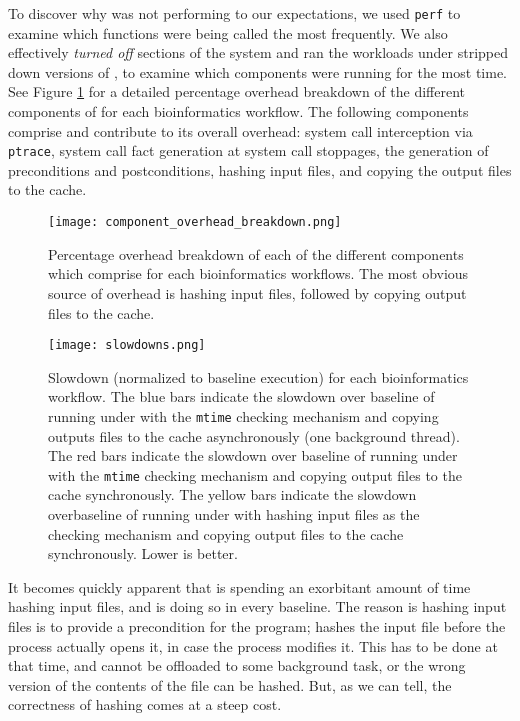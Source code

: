 To discover why \pc was not performing to our expectations, we used \texttt{perf} \cite{perf} to examine which functions were being called the most frequently. We also effectively \textit{turned off} sections of the system and ran the workloads under stripped down versions of \pc, to examine which components were running for the most time. See Figure \ref{fig:component_overhead_breakdown} for a detailed percentage overhead breakdown of the different components of \pc for each bioinformatics workflow. The following components comprise \pc and contribute to its overall overhead: system call interception via \texttt{ptrace}, system call fact generation at system call stoppages, the generation of preconditions and postconditions, hashing input files, and copying the output files to the cache. 

\begin{figure}[ht]
\centering
\texttt{[image: component\_overhead\_breakdown.png]}
\caption{\label{fig:component_overhead_breakdown} Percentage overhead breakdown of each of the different components which comprise \pc for each  bioinformatics workflows. The most obvious source of overhead is hashing input files, followed by copying output files to the cache.}
\end{figure}

\begin{figure}[ht]
\centering
\texttt{[image: slowdowns.png]}
\caption{\label{fig:pc_slowdowns} Slowdown (normalized to baseline execution) for each bioinformatics workflow. The blue bars indicate the slowdown over baseline of running under \pc with the \texttt{mtime} checking mechanism and copying outputs files to the cache asynchronously (one background thread). The red bars indicate the slowdown over baseline of running under \pc with the \texttt{mtime} checking mechanism and copying output files to the cache synchronously. The yellow bars indicate the slowdown overbaseline of running under \pc with hashing input files as the checking mechanism and copying output files to the cache synchronously. Lower is better.}
\end{figure}

It becomes quickly apparent that \pc is spending an exorbitant amount of time hashing input files, and is doing so in every baseline. The reason \pc is hashing input files is to provide a precondition for the program; \pc  hashes the input file before the process actually opens it, in case the process modifies it. This has to be done at that time, and cannot be offloaded to some background task, or the wrong version of the contents of the file can be hashed. But, as we can tell, the correctness of hashing comes at a steep cost.

